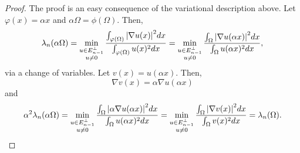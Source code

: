 \begin{proof}
    The proof is an easy consequence of the variational description above. Let \(\varphi(x) = \alpha x\) and \(\alpha \Omega = \phi(\Omega)\). Then,
    \begin{equation*}
        \lambda_n(\alpha \Omega) = \min_{\substack{u \in E^\perp_{n-1} \\ u \neq 0}}  \frac{\int_{\varphi(\Omega)} \abs{\nabla u(x)}^2 dx}{\int_{\varphi(\Omega)} u(x)^2 dx} = \min_{\substack{u \in E^\perp_{n-1} \\ u \neq 0}} \frac{\int_{\Omega} \abs{\nabla u(\alpha x)}^2 dx}{\int_{\Omega} u(\alpha x)^2 dx},
    \end{equation*}
    via a change of variables. Let \(v(x) = u(\alpha x)\). Then,
    \[
        \nabla v(x) = \alpha \nabla u (\alpha x)
    \]
    and
    \begin{equation*}
        \alpha^2\lambda_n(\alpha \Omega) = \min_{\substack{u \in E^\perp_{n-1} \\ u \neq 0}} \frac{\int_{\Omega} \abs{\alpha\nabla u(\alpha x)}^2 dx}{\int_{\Omega} u(\alpha x)^2 dx} = \min_{\substack{u \in E^\perp_{n-1} \\ u \neq 0}} \frac{\int_{\Omega} \abs{\nabla v(x)}^2 dx}{\int_{\Omega} v(x)^2 dx} = \lambda_n(\Omega).
    \end{equation*}
    
\end{proof}

